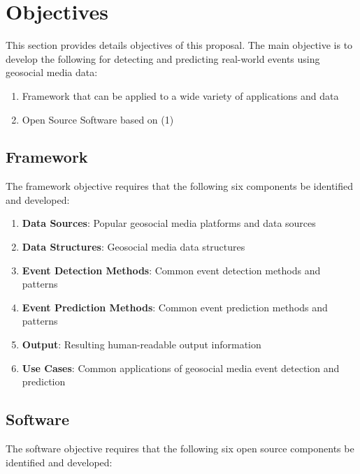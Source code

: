 \section{Objectives} \label{objectives}

This section provides details objectives of this proposal. The main objective is to develop the following for detecting and predicting real-world events using geosocial media data:

\begin{enumerate}
	\item Framework that can be applied to a wide variety of applications and data
	\item Open Source Software based on (1)
\end{enumerate}

\subsection{Framework} \label{framework}

The framework objective requires that the following six components be identified and developed:

\begin{enumerate}
	\item \textbf{Data Sources}: Popular geosocial media platforms and data sources
	\item \textbf{Data Structures}: Geosocial media data structures
	\item \textbf{Event Detection Methods}: Common event detection methods and patterns
	\item \textbf{Event Prediction Methods}: Common event prediction methods and patterns
	\item \textbf{Output}: Resulting human-readable output information
	\item \textbf{Use Cases}: Common applications of geosocial media event detection and prediction
\end{enumerate}

\subsection{Software} \label{software}

The software objective requires that the following six open source components be identified and developed:

